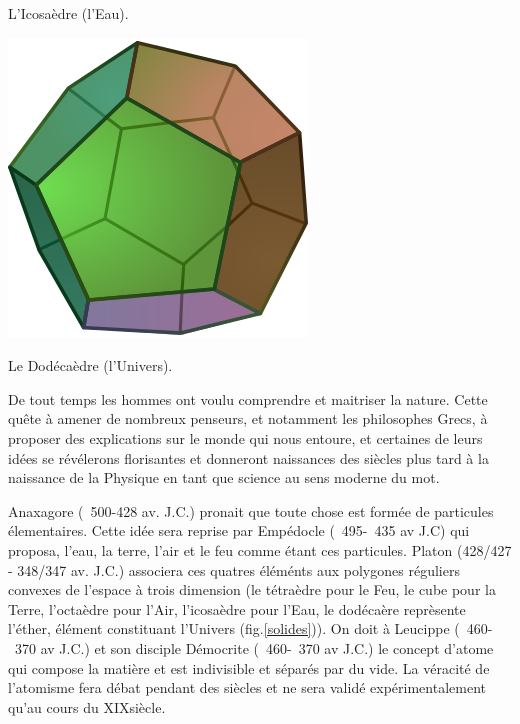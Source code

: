 {\begin{center}
\vspace*{-0.25cm}
\begin{center}\normalfont\small {L'Icosaèdre (l'Eau).}\end{center}
\vspace*{-0.25cm}
\includegraphics[width=0.25\marginparwidth]{SM/Dodecahedron.png}
\vspace*{-0.25cm}
\begin{center}\normalfont\small {Le Dodécaèdre (l'Univers).}\end{center}
\vspace*{-0.25cm}
\label{solides}
\end{center}
}
De tout temps les hommes ont voulu comprendre et maitriser la nature. Cette quête à amener de nombreux penseurs, et notamment les philosophes Grecs, à proposer des explications sur le monde qui nous entoure, et certaines de leurs idées se révélerons florisantes et donneront naissances des siècles plus tard à la naissance de la Physique en tant que science au sens moderne du mot. 

Anaxagore (~500-428 av. J.C.) pronait que toute chose est formée de particules élementaires. Cette idée sera reprise par Empédocle (~495-~435 av J.C) qui proposa, l'eau, la terre, l'air et le feu comme étant ces particules. Platon (428/427 - 348/347 av. J.C.) associera ces quatres éléménts aux polygones réguliers convexes de l'espace à trois dimension (le tétraèdre pour le Feu, le cube pour la Terre, l'octaèdre pour l'Air, l'icosaèdre pour l'Eau, le dodécaère reprèsente l'éther, élément constituant l'Univers (fig.\ref{solides})). On doit à Leucippe (~460-~370 av J.C.) et son disciple Démocrite (~460-~370 av J.C.) le concept d'atome qui compose la matière et est indivisible et séparés par du vide. La véracité de l'atomisme fera débat pendant des siècles et ne sera validé expérimentalement qu'au cours du XIX\ieme siècle.

